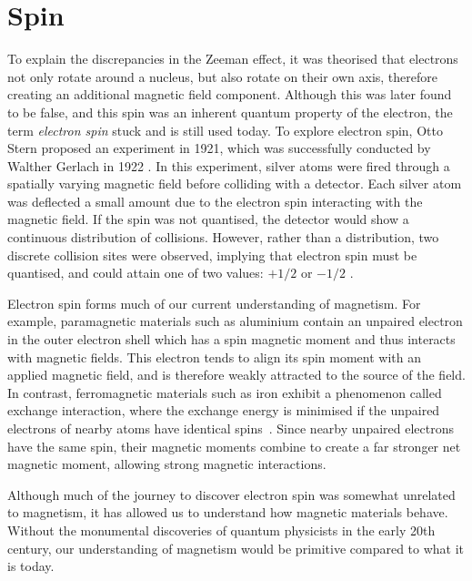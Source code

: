 \section*{Spin}
To explain the discrepancies in the Zeeman effect, it was theorised that electrons not only rotate around a nucleus, but also rotate on their own axis, therefore creating an additional magnetic field component. Although this was later found to be false, and this spin was an inherent quantum property of the electron, the term \textit{electron spin} stuck and is still used today. To explore electron spin, Otto Stern proposed an experiment in 1921, which was successfully conducted by Walther Gerlach in 1922 \cite{Mattis1981}. In this experiment, silver atoms were fired through a spatially varying magnetic field before colliding with a detector. Each silver atom was deflected a small amount due to the electron spin interacting with the magnetic field. If the spin was not quantised, the detector would show a continuous distribution of collisions. However, rather than a distribution, two discrete collision sites were observed, implying that electron spin must be quantised, and could attain one of two values: \(+1/2\) or \(-1/2\) \cite{Morrish1965}.

Electron spin forms much of our current understanding of magnetism. For example, paramagnetic materials such as aluminium contain an unpaired electron in the outer electron shell which has a spin magnetic moment and thus interacts with magnetic fields. This electron tends to align its spin moment with an applied magnetic field, and is therefore weakly attracted to the source of the field. In contrast, ferromagnetic materials such as iron exhibit a phenomenon called exchange interaction, where the exchange energy is minimised if the unpaired electrons of nearby atoms have identical spins~\cite{Stoner1934}. Since nearby unpaired electrons have the same spin, their magnetic moments combine to create a far stronger net magnetic moment, allowing strong magnetic interactions.

Although much of the journey to discover electron spin was somewhat unrelated to magnetism, it has allowed us to understand how magnetic materials behave. Without the monumental discoveries of quantum physicists in the early 20th century, our understanding of magnetism would be primitive compared to what it is today.

